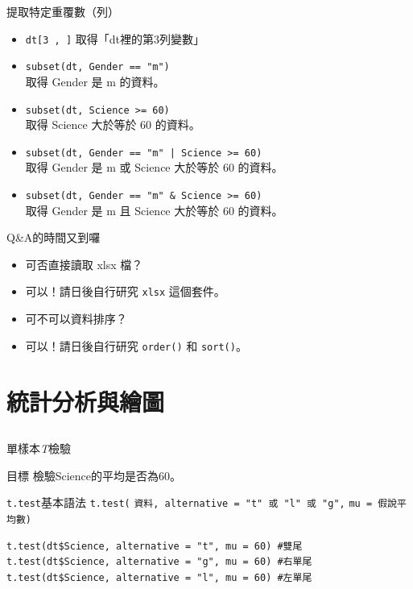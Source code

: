 \documentclass[12pt]{beamer}
\begin{document}
\begin{frame}[fragile]{提取特定重覆數（列）}
\begin{itemize}
\item \verb+dt[3 , ]+ 取得「dt裡的第3列變數」
\item \verb+subset(dt, Gender == "m")+ \\ 取得 Gender 是 m 的資料。
\item \verb+subset(dt, Science >= 60)+ \\ 取得 Science 大於等於 60 的資料。
\item \verb+subset(dt, Gender == "m" | Science >= 60)+ \\ 取得 Gender 是 m \alert{或} Science 大於等於 60 的資料。
\item \verb+subset(dt, Gender == "m" & Science >= 60)+ \\ 取得 Gender 是 m \alert{且} Science 大於等於 60 的資料。
\end{itemize}
\end{frame}

\begin{frame}[fragile]{Q\&A的時間又到囉}
\begin{itemize}
\item[Q] 可否直接讀取 xlsx 檔？\\
\item[A] 可以！請日後自行研究 \verb+xlsx+ 這個套件。
\end{itemize}
\begin{itemize}
\item[Q] 可不可以資料排序？\\
\item[A] 可以！請日後自行研究 \verb+order()+ 和 \verb+sort()+。
\end{itemize}
\end{frame}


\section{統計分析與繪圖}\subsection{}

\begin{frame}[fragile]{單樣本\emph{T}檢驗}

\begin{block}{目標}
檢驗Science的平均是否為60。
\end{block}
\begin{block}{\texttt{t.test}基本語法}
\verb+t.test(+
  \verb+資料, alternative = "t" 或 "l" 或 "g",+
  \verb+mu = 假說平均數)+
\end{block}
\begin{verbatim}
t.test(dt$Science, alternative = "t", mu = 60) #雙尾
t.test(dt$Science, alternative = "g", mu = 60) #右單尾
t.test(dt$Science, alternative = "l", mu = 60) #左單尾
\end{verbatim}
\end{frame}
\end{document}
